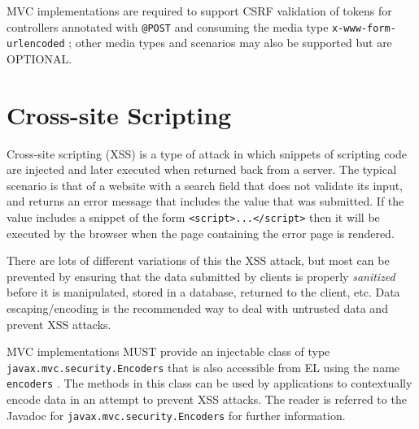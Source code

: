 MVC implementations are required to support CSRF validation of
tokens for controllers annotated with {\tt @POST} and consuming the
media type {\tt x-www-form-urlencoded} ; other media 
types and scenarios may also be supported but are OPTIONAL.

\section{Cross-site Scripting}

Cross-site scripting (XSS) is a type of attack in which snippets of scripting 
code are injected and later executed when returned back from a server. The
typical scenario is that of a website with a search field that does not validate
its input, and returns an error message that includes the value that was
submitted. If the value includes a snippet of the form {\tt <script>...</script>}
then it will be executed by the browser when the page containing the 
error page is rendered.

There are lots of different variations of this the XSS attack, but most can be
prevented by ensuring that the data submitted by clients is properly {\em sanitized}
before it is manipulated, stored in a database, returned to the client, etc.
Data escaping/encoding is the recommended way to deal with untrusted
data and prevent XSS attacks. 

MVC implementations MUST provide an injectable class of type
{\tt javax.mvc.security.Encoders} that is also accessible from EL using
the name {\tt encoders} . The methods in this class can be used
by applications to contextually encode data in an attempt to prevent 
XSS attacks. The reader is referred to the Javadoc for {\tt javax.mvc.security.Encoders} 
for further information.
